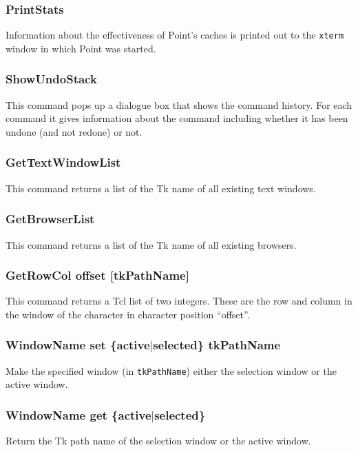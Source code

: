 \subsubsection{PrintStats}
Information about the effectiveness of Point's caches is
printed out to the {\tt xterm} window in which Point was started.

\subsubsection{ShowUndoStack}
This command pops up a dialogue box that shows the command
history.
For each command it gives information about the command
including whether it has been undone (and not redone) or not.

\subsubsection{GetTextWindowList}
This command returns a list of the Tk name of all existing text windows.

\subsubsection{GetBrowserList}
This command returns a list of the Tk name of all existing browsers.

\subsubsection{GetRowCol offset [tkPathName]}
This command returns a Tcl list of two integers.
These are the row and column in the window of the
character in character position ``offset''.

\subsubsection{WindowName set \{active$\mid$selected\} tkPathName}
Make the specified window (in {\tt tkPathName}) either the
selection window or the active window.

\subsubsection{WindowName get \{active$\mid$selected\}}
Return the Tk path name of the selection window or the active window.

